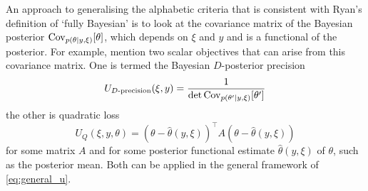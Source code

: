 \documentclass[a4paper, 10pt]{report}
\theoremstyle{plain}
\begin{document}
	An approach to generalising the alphabetic criteria that is consistent with Ryan's definition of `fully Bayesian' is to look at the covariance matrix of the Bayesian posterior $\mathrm{Cov}_{p(\theta|y,\xi)}[\theta]$, which depends on $\xi$ and $y$ and is a functional of the posterior.
	For example, \citet{ryan2016review} mention two scalar objectives that can arise from this covariance matrix. One is termed the Bayesian $D$-posterior precision
	\begin{equation}
	U_{D\text{-precision}}(\xi,y) = \frac{1}{\det \mathrm{Cov}_{p(\theta'|y,\xi)}[\theta'] }
	\end{equation}
	the other is quadratic loss
	\begin{equation}
	U_Q(\xi,y,\theta) = (\theta-\hat{\theta}(y,\xi))^\top A (\theta-\hat{\theta}(y,\xi)) 
	\end{equation}
	for some matrix $A$ and for some posterior functional estimate $\hat{\theta}(y,\xi)$ of $\theta$, such as the posterior mean.
	Both can be applied in the general framework of \eqref{eq:general_u}.
	
\end{document}
